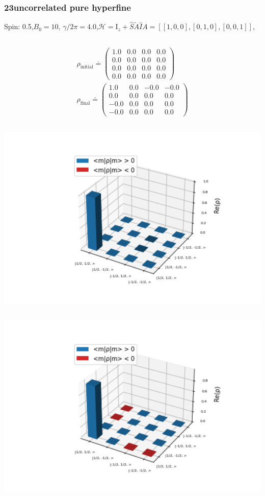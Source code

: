 \documentclass[10pt]{beamer}
\begin{document}
\begin{frame}
\frametitle{23uncorrelated pure hyperfine}
Spin: 0.5,$B_0= 10$, $\gamma/2\pi = 4.0$,$\mathcal{H}=\text{I}_{z}+ \hat{S}\tilde{A}\hat{I}$$A=[[1, 0, 0], [0, 1, 0], [0, 0, 1]]$,
\begin{columns}[T]
\begin{column}{.5\textwidth}
\begin{align*}
\rho_{\text{initial}}\doteq
\begin{pmatrix}
1.0 & 0.0 & 0.0 & 0.0 \\
0.0 & 0.0 & 0.0 & 0.0 \\
0.0 & 0.0 & 0.0 & 0.0 \\
0.0 & 0.0 & 0.0 & 0.0
\end{pmatrix}
\\
\rho_{\text{final}}\doteq
\begin{pmatrix}
1.0 & 0.0 & -0.0 & -0.0 \\
0.0 & 0.0 & 0.0 & 0.0 \\
-0.0 & 0.0 & 0.0 & 0.0 \\
-0.0 & 0.0 & 0.0 & 0.0
\end{pmatrix}
\end{align*}
\begin{column}{.5\textwidth}
\includegraphics[width=1.5\textwidth]{./spin1-2/23uncorrelated_pure_hyperfine/InitialRealPartDensityMatrix.png}
\end{column}
\begin{column}{.5\textwidth}
\includegraphics[width=1.5\textwidth]{./spin1-2/23uncorrelated_pure_hyperfine/EvolvedRealPartDensityMatrix.png}

\end{column}
\end{column}
\end{columns}$$
\end{frame}
\end{document}
